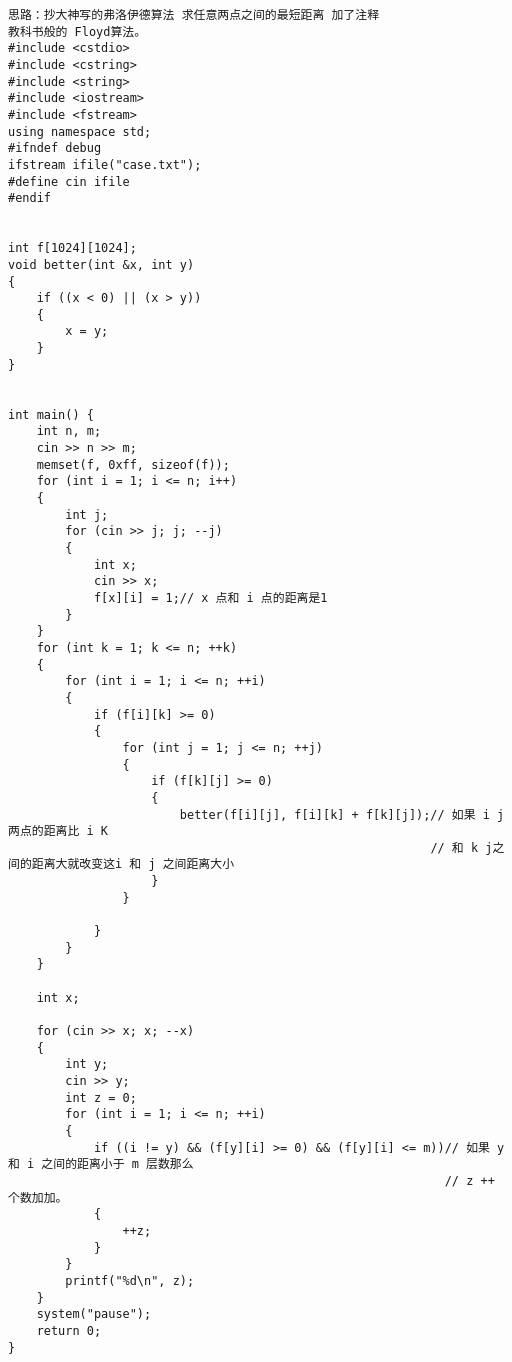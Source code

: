\begin{lstlisting}[basicstyle=\small\ttfamily, caption={}, numbers=none]
思路：抄大神写的弗洛伊德算法 求任意两点之间的最短距离 加了注释
教科书般的 Floyd算法。
#include <cstdio>
#include <cstring>
#include <string>
#include <iostream>
#include <fstream>
using namespace std;
#ifndef debug
ifstream ifile("case.txt");
#define cin ifile
#endif
 
 
int f[1024][1024];
void better(int &x, int y)
{
    if ((x < 0) || (x > y))
    {
        x = y;
    }
}
 
 
int main() {
    int n, m;
    cin >> n >> m;
    memset(f, 0xff, sizeof(f));
    for (int i = 1; i <= n; i++)
    {
        int j;
        for (cin >> j; j; --j)
        {
            int x;
            cin >> x;
            f[x][i] = 1;// x 点和 i 点的距离是1
        }
    }
    for (int k = 1; k <= n; ++k)
    {
        for (int i = 1; i <= n; ++i)
        {
            if (f[i][k] >= 0)
            {
                for (int j = 1; j <= n; ++j)
                {
                    if (f[k][j] >= 0)
                    {
                        better(f[i][j], f[i][k] + f[k][j]);// 如果 i j 两点的距离比 i K
                                                           // 和 k j之间的距离大就改变这i 和 j 之间距离大小
                    }
                }
                 
            }
        }
    }
 
    int x;
 
    for (cin >> x; x; --x)
    {
        int y;
        cin >> y;
        int z = 0;
        for (int i = 1; i <= n; ++i)
        {
            if ((i != y) && (f[y][i] >= 0) && (f[y][i] <= m))// 如果 y 和 i 之间的距离小于 m 层数那么
                                                             // z ++ 个数加加。
            {
                ++z;
            }
        }
        printf("%d\n", z);
    }
    system("pause");
    return 0;
}
\end{lstlisting}




